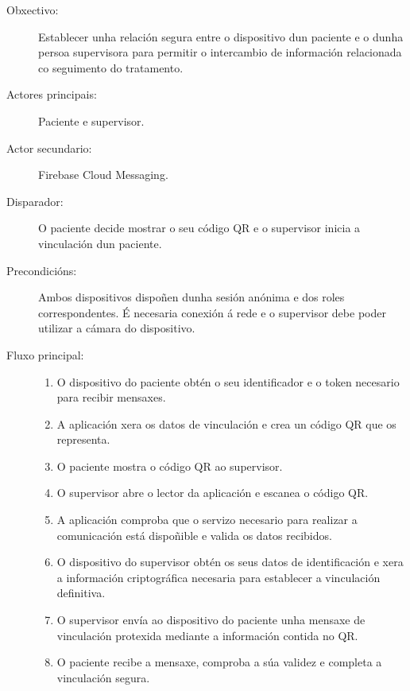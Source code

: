 \begin{description}

\item[Obxectivo:] Establecer unha relación segura entre o dispositivo dun
paciente e o dunha persoa supervisora para permitir o intercambio de información
relacionada co seguimento do tratamento.

\item[Actores principais:] Paciente e supervisor.

\item[Actor secundario:] Firebase Cloud Messaging.

\item[Disparador:] O paciente decide mostrar o seu código QR e o supervisor
inicia a vinculación dun paciente.

\item[Precondicións:] Ambos dispositivos dispoñen dunha sesión anónima e dos
roles correspondentes. É necesaria conexión á rede e o supervisor debe poder
utilizar a cámara do dispositivo.

\item[Fluxo principal:] \hfill
\begin{enumerate}
    \item O dispositivo do paciente obtén o seu identificador e o token necesario
    para recibir mensaxes.

    \item A aplicación xera os datos de vinculación e crea un código QR que os
    representa.

    \item O paciente mostra o código QR ao supervisor.

    \item O supervisor abre o lector da aplicación e escanea o código QR.

    \item A aplicación comproba que o servizo necesario para realizar a
    comunicación está dispoñible e valida os datos recibidos.

    \item O dispositivo do supervisor obtén os seus datos de identificación e
    xera a información criptográfica necesaria para establecer a vinculación
    definitiva.

    \item O supervisor envía ao dispositivo do paciente unha mensaxe de
    vinculación protexida mediante a información contida no QR.

    \item O paciente recibe a mensaxe, comproba a súa validez e completa a
    vinculación segura.


\end{enumerate}
\end{description}
